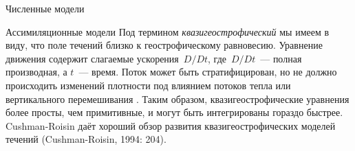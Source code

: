 \begin{chapter}{Численные модели}
\begin{section}{Ассимиляционные модели}
Под термином \emph{квазигеострофический} 
мы имеем в виду, что поле течений близко к геострофическому равновесию. 
Уравнение движения содержит слагаемые ускорения~$D/Dt$, 
где~$D/Dt$~--- полная производная, а $t$~--- время. 
Поток может быть стратифицирован, но не должно происходить
изменений плотности под влиянием потоков тепла 
или вертикального перемешивания%
. 
Таким образом, квазигеострофические уравнения более просты, чем 
примитивные, и могут быть интегрированы гораздо быстрее. 
Cushman-Roisin даёт хороший обзор развития
квазигеострофических моделей течений (Cushman-Roisin, 1994: 204).
%


\end{section}
\end{chapter}
